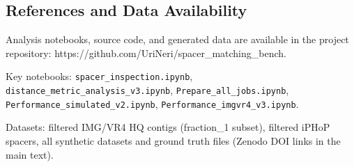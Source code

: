\documentclass[
]{article}
\begin{document}
\subsection{References and Data
Availability}\label{references-and-data-availability}

Analysis notebooks, source code, and generated data are available in the
project repository: https://github.com/UriNeri/spacer\_matching\_bench.

Key notebooks: \texttt{spacer\_inspection.ipynb},
\texttt{distance\_metric\_analysis\_v3.ipynb},
\texttt{Prepare\_all\_jobs.ipynb},
\texttt{Performance\_simulated\_v2.ipynb},
\texttt{Performance\_imgvr4\_v3.ipynb}.

Datasets: filtered IMG/VR4 HQ contigs (fraction\_1 subset), filtered
iPHoP spacers, all synthetic datasets and ground truth files (Zenodo DOI
links in the main text).


\printbibliography
\end{document}
